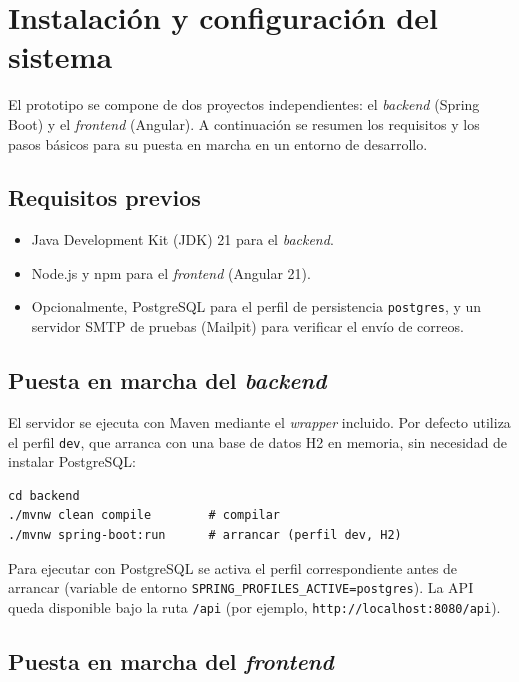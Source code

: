 \section{Instalación y configuración del sistema}
\label{sec:apendice-instalacion}

El prototipo se compone de dos proyectos independientes: el \textit{backend} (Spring Boot) y el \textit{frontend} (Angular). A continuación se resumen los requisitos y los pasos básicos para su puesta en marcha en un entorno de desarrollo.

\subsection{Requisitos previos}

\begin{itemize}
  \item Java Development Kit (JDK) 21 para el \textit{backend}.
  \item Node.js y npm para el \textit{frontend} (Angular 21).
  \item Opcionalmente, PostgreSQL para el perfil de persistencia \texttt{postgres}, y un servidor SMTP de pruebas (Mailpit) para verificar el envío de correos.
\end{itemize}

\subsection{Puesta en marcha del \textit{backend}}

El servidor se ejecuta con Maven mediante el \textit{wrapper} incluido. Por defecto utiliza el perfil \texttt{dev}, que arranca con una base de datos H2 en memoria, sin necesidad de instalar PostgreSQL:

\begin{verbatim}
cd backend
./mvnw clean compile        # compilar
./mvnw spring-boot:run      # arrancar (perfil dev, H2)
\end{verbatim}

Para ejecutar con PostgreSQL se activa el perfil correspondiente antes de arrancar (variable de entorno \texttt{SPRING\_PROFILES\_ACTIVE=postgres}). La API queda disponible bajo la ruta \texttt{/api} (por ejemplo, \texttt{http://localhost:8080/api}).

\subsection{Puesta en marcha del \textit{frontend}}

